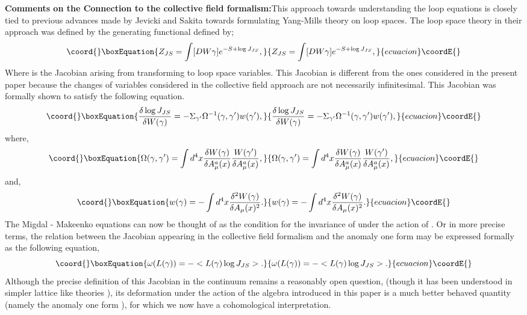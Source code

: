 \documentclass[a4paper,12]{article}
\begin{document}
{\bf Comments on the Connection to the  collective field formalism:}This approach towards understanding the 
loop 
equations is closely tied to previous advances made  by Jevicki and Sakita 
\cite{Collective1, Collective2, 
Collective3, Collective4} towards formulating Yang-Mills theory on loop 
spaces. The loop space theory in their approach was defined by the generating functional \coordHE{} defined 
by\cite{Collective4};
\begin{equation}\coord{}\boxEquation{
Z_{JS} = \int [DW{\gamma }] e^{-S + \log J_{JS}},
}{
Z_{JS} = \int [DW{\gamma }] e^{-S + \log J_{JS}},
}{ecuacion}\coordE{}\end{equation}
Where \coordHE{} is the Jacobian arising from transforming to loop space variables. This Jacobian is different 
from the ones considered in the present paper because the changes of variables considered in the collective 
field approach are not necessarily infinitesimal. This Jacobian was formally shown to satisfy the following 
equation.
\begin{equation}\coord{}\boxEquation{
\frac{\delta \log J_{JS}}{\delta W(\gamma )} = -\Sigma _{\gamma '}\Omega ^{-1}(\gamma , \gamma ')w(\gamma '),
}{
\frac{\delta \log J_{JS}}{\delta W(\gamma )} = -\Sigma _{\gamma '}\Omega ^{-1}(\gamma , \gamma ')w(\gamma '),
}{ecuacion}\coordE{}\end{equation}
where,
\begin{equation}\coord{}\boxEquation{
\Omega (\gamma, \gamma ') = \int d^4x\frac{\delta W(\gamma )}{\delta A^a_\mu (x)}\frac{W(\gamma ')}{\delta 
A^a_\mu (x)},
}{
\Omega (\gamma, \gamma ') = \int d^4x\frac{\delta W(\gamma )}{\delta A^a_\mu (x)}\frac{W(\gamma ')}{\delta 
A^a_\mu (x)},
}{ecuacion}\coordE{}\end{equation}
and,
\begin{equation}\coord{}\boxEquation{
w(\gamma ) = -\int d^4 x \frac{\delta ^2 W(\gamma )}{\delta A_\mu (x)^2}.
}{
w(\gamma ) = -\int d^4 x \frac{\delta ^2 W(\gamma )}{\delta A_\mu (x)^2}.
}{ecuacion}\coordE{}\end{equation}
The Migdal - Makeenko equations can now be thought of as the condition for the invariance of \coordHE{} under 
the action of \coordHE{}. Or in more precise terms, the relation between the Jacobian appearing in the 
collective field formalism and the anomaly one form may be expressed formally as the following equation,
\begin{equation}\coord{}\boxEquation{
\omega (L(\gamma )) = -<L(\gamma )\log J _{JS}>.
}{
\omega (L(\gamma )) = -<L(\gamma )\log J _{JS}>.
}{ecuacion}\coordE{}\end{equation} 
Although the precise definition of this Jacobian in the continuum remains a reasonably open question, 
(though it has 
been understood in simpler lattice like theories \cite{Collective3, 
entropy, Yaffe1}), its deformation under the 
action of the algebra introduced 
in this paper is a much better behaved quantity (namely the anomaly one form ), for which we now have a 
cohomological interpretation.
\end{document}

